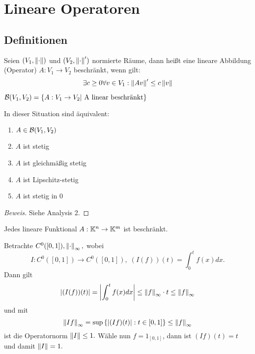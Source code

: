 \chapter{Lineare Operatoren}

\section{Definitionen}
\begin{definition}
    Seien $(V_1, \left\lVert\cdot\right\rVert)$ und $(V_2, \left\lVert\cdot\right\rVert')$ normierte Räume, dann heißt eine lineare Abbildung (Operator) $A: V_1 \to V_2$ beschränkt, wenn gilt: \[ \exists c \geq 0 \forall v \in V_1: \left\lVert Av\right\rVert' \leq c \left\lVert v\right\rVert\]
\end{definition}

\begin{rem}
    $\mathcal{B}(V_1, V_2) = \left\{A: V_1 \to V_2| \text{ A linear beschränkt}\right\}$
\end{rem}

\begin{theorem}
    In dieser Situation sind äquivalent:
    \label{B(V,W)_equiv}
    \begin{enumerate}
        \item $A \in \mathcal{B}(V_1, V_2)$
        \item $A$ ist stetig
        \item $A$ ist gleichmäßig stetig
        \item $A$ ist Lipschitz-stetig
        \item $A$ ist stetig in $0$
    \end{enumerate}
    \begin{proof}[Beweis] Siehe Analysis 2.
    
    \end{proof}
\end{theorem}

\begin{theorem} 
    Jedes lineare Funktional $A: \mathbb{K}^n \to \mathbb{K}^m$ ist beschränkt.
\end{theorem}

\begin{ex} \label{Volterra_op}
    Betrachte $C^0([0, 1]), \left\lVert\cdot\right\rVert_\infty,$ wobei \[I: C^0([0, 1]) \to C^0([0, 1]), \;(I(f))(t) = \int_0^tf(x)dx.\] Dann gilt \[\left\lvert (I(f))(t) \right\rvert = \left\lvert \int_0^tf(x)dx \right\rvert \le \left\lVert f\right\rVert_\infty\cdot t \leq \left\lVert f\right\rVert_\infty\]
    und mit \[\left\lVert If\right\rVert_\infty = \sup\left\{\left\lvert (If)(t) \right\rvert:t\in [0, 1]\right\} \leq \left\lVert f\right\rVert_\infty\]
    ist die Operatornorm $\left\lVert I\right\rVert \leq 1.$ Wähle nun $f = 1_{[0, 1]}$, dann ist $(If)(t) = t$ und damit $\left\lVert I\right\rVert = 1.$
\end{ex}

